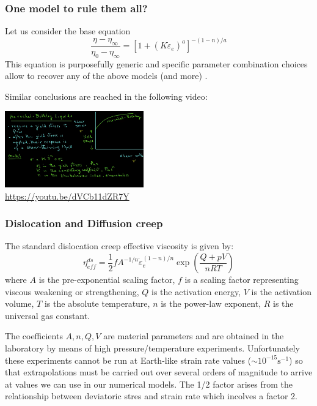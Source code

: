 \subsubsection{One model to rule them all?}

Let us consider the base equation
\[
\frac{\eta-\eta_\infty}{\eta_0-\eta_\infty} = 
\left[ 1+(K \dot{\varepsilon}_e)^a  \right]^{-(1-n)/a}
\]
This equation is purposefully generic and specific parameter combination choices 
allow to recover any of the above models (and more) \cite{osru14}.

Similar conclusions are reached in the following video:
\begin{center}
\includegraphics[width=6cm]{images/rheology/hbyoutube}\\
{\scriptsize \url{https://youtu.be/dVCb11dZR7Y}}
\end{center}



\subsubsection{Dislocation and Diffusion creep}

The standard dislocation creep effective viscosity is given by:
\[
\eta_{eff}^{ds} = \frac{1}{2} f A^{-1/n} \dot{\varepsilon}_{e}^{(1-n)/n} \exp \left( \frac{Q+pV}{nRT}  \right)
\] 
where $A$ is the pre-exponential scaling factor, $f$ is a scaling factor
representing viscous weakening or strengthening, $Q$ is the activation energy, 
$V$ is the activation volume, $T$ is the absolute temperature, $n$ is the power-law 
exponent, $R$ is the universal gas constant. 

The coefficients $A,n,Q,V$ are material parameters and are obtained in the laboratory 
by means of high pressure/temperature experiments\cite{kawu93}. Unfortunately 
these experiments cannot be run at Earth-like strain rate values ($\sim 10^{-15}\text{s}^{-1}$)
so that extrapolations must be carried out over several orders of magnitude to 
arrive at values we can use in our numerical models. 
The 1/2 factor arises from the relationship between deviatoric stres and strain rate which 
incolves a factor 2.

